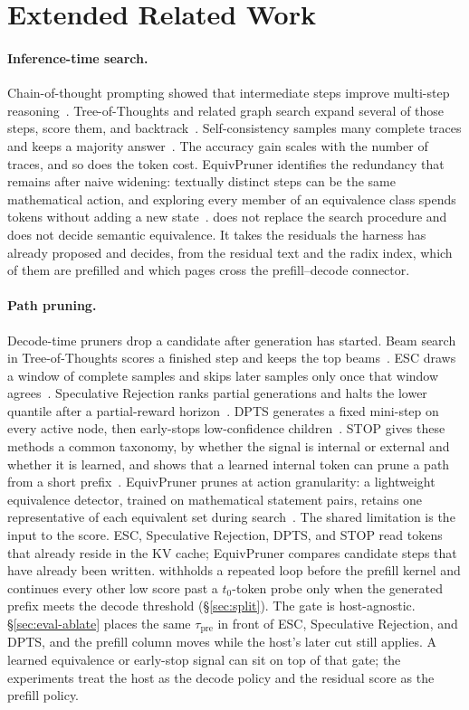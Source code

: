 \section{Extended Related Work}
\label{sec:related-full}

\paragraph{Inference-time search.}
Chain-of-thought prompting showed that intermediate steps improve multi-step reasoning~\cite{cot}.
Tree-of-Thoughts and related graph search expand several of those steps, score them, and backtrack~\cite{tot,mctsllm}.
Self-consistency samples many complete traces and keeps a majority answer~\cite{selfconsistency}.
The accuracy gain scales with the number of traces, and so does the token cost.
EquivPruner identifies the redundancy that remains after naive widening: textually distinct steps can be the same mathematical action, and exploring every member of an equivalence class spends tokens without adding a new state~\cite{equivpruner}.
\sys does not replace the search procedure and does not decide semantic equivalence.
It takes the residuals the harness has already proposed and decides, from the residual text and the radix index, which of them are prefilled and which pages cross the prefill--decode connector.

\paragraph{Path pruning.}
Decode-time pruners drop a candidate after generation has started.
Beam search in Tree-of-Thoughts scores a finished step and keeps the top beams~\cite{tot}.
ESC draws a window of complete samples and skips later samples only once that window agrees~\cite{esc}.
Speculative Rejection ranks partial generations and halts the lower quantile after a partial-reward horizon~\cite{specrej}.
DPTS generates a fixed mini-step on every active node, then early-stops low-confidence children~\cite{dpts}.
STOP gives these methods a common taxonomy, by whether the signal is internal or external and whether it is learned, and shows that a learned internal token can prune a path from a short prefix~\cite{stoploss}.
EquivPruner prunes at action granularity: a lightweight equivalence detector, trained on mathematical statement pairs, retains one representative of each equivalent set during search~\cite{equivpruner}.
The shared limitation is the input to the score.
ESC, Speculative Rejection, DPTS, and STOP read tokens that already reside in the KV cache; EquivPruner compares candidate steps that have already been written.
\sys withholds a repeated loop before the prefill kernel and continues every other low score past a $t_0$-token probe only when the generated prefix meets the decode threshold (\S\ref{sec:split}).
The gate is host-agnostic.
\S\ref{sec:eval-ablate} places the same $\tau_{\mathrm{pre}}$ in front of ESC, Speculative Rejection, and DPTS, and the prefill column moves while the host's later cut still applies.
A learned equivalence or early-stop signal can sit on top of that gate; the experiments treat the host as the decode policy and the residual score as the prefill policy.

